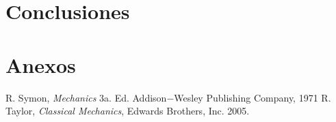 \lipsum[1]


\section{Conclusiones}
\label{sec:conclusiones}

\lipsum[1]


\section{Anexos}
\label{sec:anexos}

\lipsum[1]

\lipsum[1]



\nocite{*}
%
%

\begin{thebibliography}{00}
 R. Symon, \textit{Mechanics} 3a. Ed. Addison$-$Wesley Publishing Company, 1971
 R. Taylor, \textit{Classical Mechanics}, Edwards Brothers, Inc. 2005.
\end{thebibliography}






